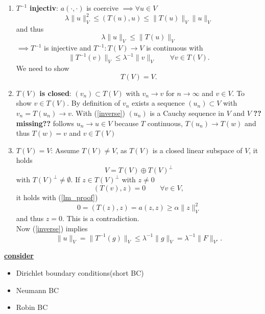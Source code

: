 \begin{enumerate}[=label=(\alph*)]
	\item  $T^{-1}$\textbf{ injectiv}: \enter
	$a(\cdot, \cdot)$ is coercive $\implies \forall u \in V$
	\begin{equation*}
		\lambda \|u\|^2_V \leq (T(u),u) \leq \|T(u)\|_V\|u\|_V
	\end{equation*}
	and thus 
	\begin{equation}\label{inverse}
		\lambda \|u\|_V \leq \|T(u)\|_V
	\end{equation}
	$\implies T^{-1}$ is injective and $T^{-1}: T(V) \to V$ is continuous with
	\begin{equation*}
		\|T^{-1}(v)\|_V \leq \lambda^{-1}\|v\|_V \qquad \forall v \in T(V). 
	\end{equation*}
	We need to show
	\begin{equation*}
		T(V) = V.
	\end{equation*}
	\item $T(V)$ \textbf{is closed}:\enter
	 $(v_n) \subset T(V)$ with $v_n \to v$ for $n \to \infty$ and $v \in V$. To show $v \in T(V)$. By definition of $v_n$ exists a sequence $(u_n) \subset V$ with $v_n = T(u_n) \to v$. With (\ref{inverse}) $(u_n)$ is a Cauchy sequence in $V$ and $V$ \textbf{??missing??} follows $u_n \to u \in V$ because $T$ continuous, $T(u_n) \to T(w)$ and thus $T(w)=v$ and $v \in T(V)$\enter
	\item $T(V) = V$:\enter
	 Assume $T(V) \neq V$, as $T(V)$ is a closed linear subspace of $V$, it holds 
	\begin{equation*}
		V = T(V) \oplus T(V)^\perp
	\end{equation*}
	with $T(V)^\perp \neq \emptyset$. If $z \in T(V)^\perp $ with $z \neq 0$
	\begin{equation*}
		(T(v),z) = 0 \qquad \forall v \in V,
	\end{equation*}
	it holds with (\ref{lm_proof}) 
	\begin{equation*}
		0 = (T(z),z) = a(z,z) \geq \alpha \|z\|^2_V
	\end{equation*}
	and thus $z = 0$. This is a contradiction.\\
	Now (\ref{inverse}) implies
	\begin{equation*}
		\|u\|_V = \|T^{-1}(g)\|_V \leq \lambda^{-1}\|g\|_V = \lambda^{-1}\|F\|_{V'}.
	\end{equation*}
\end{enumerate}

\textbf{\underline{consider}}
\begin{itemize}
	\item Dirichlet boundary conditions(short BC)\enter
	\item Neumann BC\enter
	\item Robin BC
\end{itemize}


